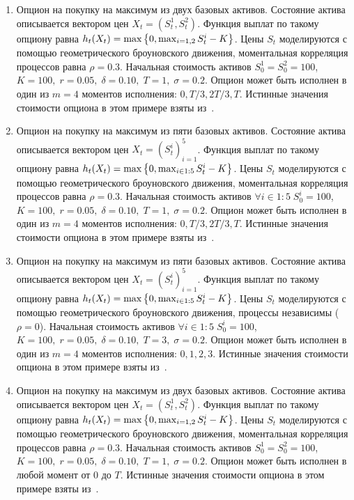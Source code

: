 \begin{enumerate}[label={П\arabic*}, align=right]
	\item\label{example_1} Опцион на покупку на максимум из двух базовых активов. Состояние актива описывается вектором цен $X_t = \left(S_t^1, S_t^2\right)$. Функция выплат по такому опциону равна $h_t(X_t) = \max\left\lbrace0, \max_{i=1,2}S_t^i - K\right\rbrace$. Цены $S_t$ моделируются с помощью геометрического броуновского движения, моментальная корреляция процессов равна $\rho=0.3$. Начальная стоимость активов $S^1_0 = S^2_0 = 100$, $K = 100,\;r = 0.05,\;\delta = 0.10,\;T=1,\;\sigma=0.2$. Опцион может быть исполнен в один из $m=4$ моментов исполнения: $0, T/3, 2T/3, T$. Истинные значения стоимости опциона в этом примере взяты из~\cite[стр.\,1340]{Broadie1997}.

	\item\label{example_2} Опцион на покупку на максимум из пяти базовых активов. Состояние актива описывается вектором цен $X_t = \left(S_t^i\right)_{i=1}^5$. Функция выплат по такому опциону равна $h_t(X_t) = \max\left\lbrace0, \max_{i\in{1\mathbin{:}5}}S_t^i - K\right\rbrace$. Цены $S_t$ моделируются с помощью геометрического броуновского движения, моментальная корреляция процессов равна $\rho=0.3$. Начальная стоимость активов $\forall i\in{1\mathbin{:}5}\;S^i_0 = 100$, $K = 100,\;r = 0.05,\;\delta = 0.10,\;T=1,\;\sigma=0.2$. Опцион может быть исполнен в один из $m=4$ моментов исполнения: $0, T/3, 2T/3, T$. Истинные значения стоимости опциона в этом примере взяты из~\cite[стр.\,1340]{Broadie1997}.

	\item\label{example_3} Опцион на покупку на максимум из пяти базовых активов. Состояние актива описывается вектором цен $X_t = \left(S_t^i\right)_{i=1}^5$. Функция выплат по такому опциону равна $h_t(X_t) = \max\left\lbrace0, \max_{i\in{1\mathbin{:}5}}S_t^i - K\right\rbrace$. Цены $S_t$ моделируются с помощью геометрического броуновского движения, процессы независимы ($\rho=0$). Начальная стоимость активов $\forall i\in{1\mathbin{:}5}\;S^i_0 = 100$, $K = 100,\;r = 0.05,\;\delta = 0.10,\;T=3,\;\sigma=0.2$. Опцион может быть исполнен в один из $m=4$ моментов исполнения: $0, 1, 2, 3$. Истинные значения стоимости опциона в этом примере взяты из~\cite{Broadie2004}.

	\item\label{example_4} Опцион на покупку на максимум из двух базовых активов. Состояние актива описывается вектором цен $X_t = \left(S_t^1, S_t^2\right)$. Функция выплат по такому опциону равна $h_t(X_t) = \max\left\lbrace0, \max_{i=1,2}S_t^i - K\right\rbrace$. Цены $S_t$ моделируются с помощью геометрического броуновского движения, моментальная корреляция процессов равна $\rho=0.3$. Начальная стоимость активов $S^1_0 = S^2_0 = 100$, $K = 100,\;r = 0.05,\;\delta = 0.10,\;T=1,\;\sigma=0.2$. Опцион может быть исполнен в любой момент от 0 до $T$. Истинные значения стоимости опциона в этом примере взяты из~\cite[стр.\,1342]{Broadie1997}.
\end{enumerate}

